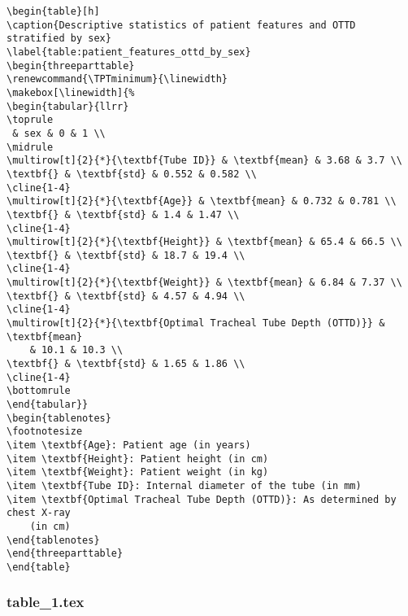 \documentclass[11pt]{article}
\begin{document}
\begin{Verbatim}[tabsize=4]
\begin{table}[h]
\caption{Descriptive statistics of patient features and OTTD stratified by sex}
\label{table:patient_features_ottd_by_sex}
\begin{threeparttable}
\renewcommand{\TPTminimum}{\linewidth}
\makebox[\linewidth]{%
\begin{tabular}{llrr}
\toprule
 & sex & 0 & 1 \\
\midrule
\multirow[t]{2}{*}{\textbf{Tube ID}} & \textbf{mean} & 3.68 & 3.7 \\
\textbf{} & \textbf{std} & 0.552 & 0.582 \\
\cline{1-4}
\multirow[t]{2}{*}{\textbf{Age}} & \textbf{mean} & 0.732 & 0.781 \\
\textbf{} & \textbf{std} & 1.4 & 1.47 \\
\cline{1-4}
\multirow[t]{2}{*}{\textbf{Height}} & \textbf{mean} & 65.4 & 66.5 \\
\textbf{} & \textbf{std} & 18.7 & 19.4 \\
\cline{1-4}
\multirow[t]{2}{*}{\textbf{Weight}} & \textbf{mean} & 6.84 & 7.37 \\
\textbf{} & \textbf{std} & 4.57 & 4.94 \\
\cline{1-4}
\multirow[t]{2}{*}{\textbf{Optimal Tracheal Tube Depth (OTTD)}} & \textbf{mean}
	& 10.1 & 10.3 \\
\textbf{} & \textbf{std} & 1.65 & 1.86 \\
\cline{1-4}
\bottomrule
\end{tabular}}
\begin{tablenotes}
\footnotesize
\item \textbf{Age}: Patient age (in years)
\item \textbf{Height}: Patient height (in cm)
\item \textbf{Weight}: Patient weight (in kg)
\item \textbf{Tube ID}: Internal diameter of the tube (in mm)
\item \textbf{Optimal Tracheal Tube Depth (OTTD)}: As determined by chest X-ray
	(in cm)
\end{tablenotes}
\end{threeparttable}
\end{table}

\end{Verbatim}

\subsubsection*{table\_1.tex}
\end{document}
